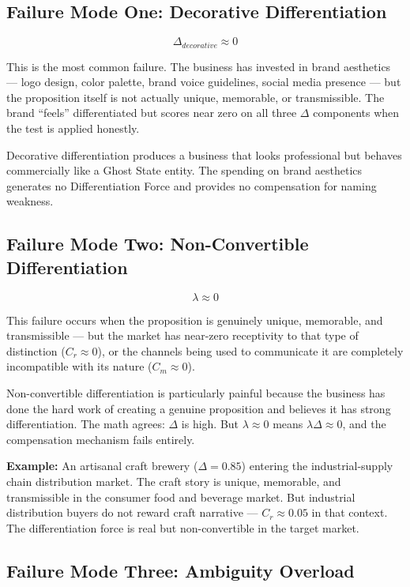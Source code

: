 \documentclass[12pt, openany]{book}
\theoremstyle{thmstyle}
\theoremstyle{defstyle}
\begin{document}
\subsection{Failure Mode One: Decorative Differentiation}

\[
\Delta_{decorative} \approx 0
\]

This is the most common failure. The business has invested in brand aesthetics --- logo design, color palette, brand voice guidelines, social media presence --- but the proposition itself is not actually unique, memorable, or transmissible. The brand ``feels'' differentiated but scores near zero on all three $\Delta$ components when the test is applied honestly.

Decorative differentiation produces a business that looks professional but behaves commercially like a Ghost State entity. The spending on brand aesthetics generates no Differentiation Force and provides no compensation for naming weakness.

\subsection{Failure Mode Two: Non-Convertible Differentiation}

\[
\lambda \approx 0
\]

This failure occurs when the proposition is genuinely unique, memorable, and transmissible --- but the market has near-zero receptivity to that type of distinction ($C_r \approx 0$), or the channels being used to communicate it are completely incompatible with its nature ($C_m \approx 0$).

Non-convertible differentiation is particularly painful because the business has done the hard work of creating a genuine proposition and believes it has strong differentiation. The math agrees: $\Delta$ is high. But $\lambda \approx 0$ means $\lambda\Delta \approx 0$, and the compensation mechanism fails entirely.

\textbf{Example:} An artisanal craft brewery ($\Delta = 0.85$) entering the industrial-supply chain distribution market. The craft story is unique, memorable, and transmissible in the consumer food and beverage market. But industrial distribution buyers do not reward craft narrative --- $C_r \approx 0.05$ in that context. The differentiation force is real but non-convertible in the target market.

\subsection{Failure Mode Three: Ambiguity Overload}
\end{document}
